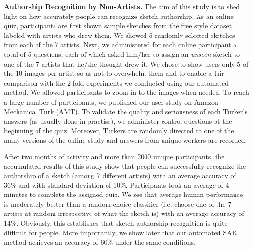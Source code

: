 


\noindent\textbf{Authorship Recognition by Non-Artists.} The aim of this study is to shed light on how accurately people can recognize sketch authorship. As an online quiz, participants are first shown sample sketches from the free style dataset labeled with artists who drew them. We showed 5 randomly selected sketches from each of the 7 artists. Next, we administered for each online participant a total of 5 questions, each of which asked him/her to assign an \emph{unseen} sketch to one of the 7 artists that he/she thought drew it. We chose to show users only 5 of the 10 images per artist so as not to overwhelm them and to enable a fair comparison with the 2-fold experiments we conducted using our automated method. We allowed participants to zoom-in to the images when needed. To reach a large number of participants, we published our user study on Amazon Mechanical Turk (AMT). To validate the quality and seriousness of each Turker's answers (as usually done in practise), we administer control questions at the beginning of the quiz. Moreover, Turkers are randomly directed to one of the many versions of the online study and answers from unique workers are recorded.

\vspace{-2mm}After two months of activity and more than 2000 unique participants, the accumulated results of this study show that people can successfully recognize the authorship of a sketch (among 7 different artists) with an average accuracy of 36\% and with standard deviation of 10\%. Participants took an average of 4 minutes to complete the assigned quiz. We see that average human performance is moderately better than a random choice classifier (i.e. choose one of the 7 artists at random irrespective of what the sketch is) with an average accuracy of 14\%. Obviously, this establishes that sketch authorship recognition is quite difficult for people. More importantly, we show later that our automated SAR method achieves an accuracy of 60\% under the same conditions.

